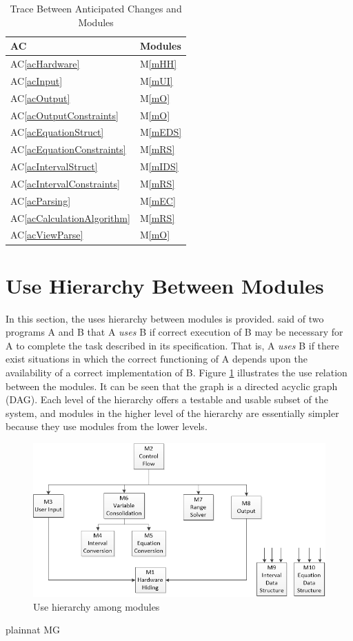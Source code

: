 \documentclass[12pt, titlepage]{article}
\newcommand{\acref}[1]{AC\ref{#1}}
\newcommand{\mref}[1]{M\ref{#1}}
\begin{document}
\begin{table}[H]
\centering
\begin{tabular}{p{} p{}}
\toprule
\textbf{AC} & \textbf{Modules}\\
\midrule
\acref{acHardware} & \mref{mHH}\\
\acref{acInput} & \mref{mUI}\\
\acref{acOutput} & \mref{mO}\\
\acref{acOutputConstraints} & \mref{mO}\\
\acref{acEquationStruct} & \mref{mEDS}\\
\acref{acEquationConstraints} & \mref{mRS}\\
\acref{acIntervalStruct} & \mref{mIDS}\\
\acref{acIntervalConstraints} & \mref{mRS}\\
\acref{acParsing} & \mref{mEC}\\
\acref{acCalculationAlgorithm} & \mref{mRS}\\
\acref{acViewParse} & \mref{mO}\\
\bottomrule
\end{tabular}
\caption{Trace Between Anticipated Changes and Modules}
\label{TblACT}
\end{table}

\section{Use Hierarchy Between Modules} \label{SecUse}

In this section, the uses hierarchy between modules is
provided. \citet{Parnas1978} said of two programs A and B that A {\em uses} B if
correct execution of B may be necessary for A to complete the task described in
its specification. That is, A {\em uses} B if there exist situations in which
the correct functioning of A depends upon the availability of a correct
implementation of B.  Figure \ref{FigUH} illustrates the use relation between
the modules. It can be seen that the graph is a directed acyclic graph
(DAG). Each level of the hierarchy offers a testable and usable subset of the
system, and modules in the higher level of the hierarchy are essentially simpler
because they use modules from the lower levels.

\begin{figure}[H]
\centering
\includegraphics[width=\textwidth]{figures/ModuleGraph.png}
\caption{Use hierarchy among modules}
\label{FigUH}
\end{figure}

\newpage

 {plainnat}
 {MG}
\end{document}
